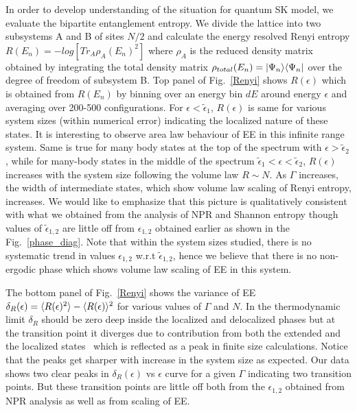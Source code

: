 \documentclass[prl,aps,twocolumn,floats,nofootinbib]{revtex4}
\begin{document}
In order to develop understanding of the situation for quantum SK model, we evaluate the bipartite entanglement entropy. We divide the lattice into two subsystems A and B of sites $N/2$ and calculate the energy resolved Renyi entropy $R(E_n) = -log[Tr_A \rho_A(E_n)^2]$ where $\rho_A$ is the reduced density matrix obtained by integrating the total density matrix $\rho_{total}(E_n) = |\Psi_n\rangle \langle \Psi_n|$ over the degree of freedom of subsystem B.  
Top panel of Fig.~\ref{Renyi} shows $R(\epsilon)$ which is obtained from $R(E_n)$ by binning over an energy bin $dE$ around energy $\epsilon$ and averaging over 200-500 configurations. For $\epsilon < \tilde{\epsilon}_1$, $R(\epsilon)$ is same for various system sizes (within numerical error) indicating
 the localized nature of these states. It is interesting to observe area law behaviour of EE in this infinite range system. Same is true for many body states at the top of the spectrum with $\epsilon > \tilde{\epsilon}_2$, while for many-body states in the middle of the spectrum $\tilde{\epsilon}_1< \epsilon< \tilde{\epsilon}_2$, $R(\epsilon)$ increases with the system size following the volume law $R \sim N$. As $\Gamma$ increases, the width of intermediate states, which show volume law scaling of Renyi entropy, increases. We would like to emphasize that this picture is qualitatively consistent with what we obtained from the analysis of NPR and Shannon entropy though values of $\tilde{\epsilon}_{1,2}$ are little off from $\epsilon_{1,2}$ obtained earlier as shown in the Fig.~\ref{phase_diag}. Note that within the system sizes studied, there is no systematic trend in values $\epsilon_{1,2}$ w.r.t $\tilde{\epsilon}_{1,2}$, hence we believe that there is no non-ergodic phase which shows volume law scaling of EE in this system.  

The bottom panel of Fig.~\ref{Renyi} shows the variance of EE  $\delta_R(\epsilon)=\langle R(\epsilon)^2\rangle-\langle R(\epsilon) \rangle^2$ for various values of $\Gamma$ and $N$. In the thermodynamic limit $\delta_R$ should be zero deep inside the localized and delocalized phases but at the transition point it diverges due to contribution from both the extended and the localized states~\cite{Bardarson2014} which is reflected as a peak in finite size calculations. Notice that the peaks get sharper with increase in the system size as expected. Our data shows two clear peaks in $\delta_R(\epsilon)$ vs $\epsilon$ curve for a given $\Gamma$ indicating two transition points.  But these transition points are little off both from the  $\epsilon_{1,2}$ obtained from NPR analysis as well as from scaling of EE.
\end{document}
